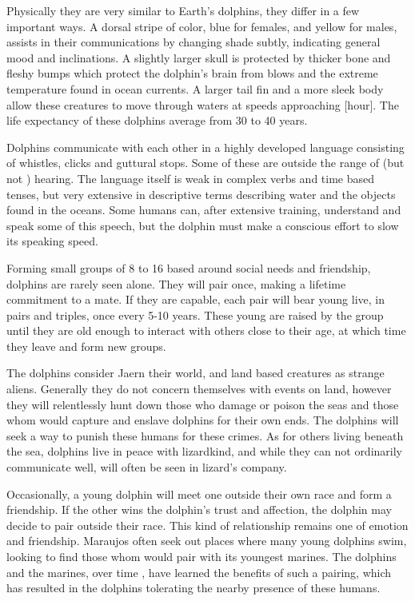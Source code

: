 \begin{multicols*}{2}
Physically they are very similar to Earth's dolphins, they differ in a few important ways. A dorsal stripe of color, blue for females, and yellow for males, assists in their communications by changing shade subtly, indicating general mood and inclinations. A slightly larger skull is protected by thicker bone and fleshy bumps which protect the dolphin's brain from blows and the extreme temperature found in ocean currents. A larger tail fin and a more sleek body allow these creatures to move through waters at speeds approaching [hour]. The life expectancy of these dolphins average from 30 to 40 years.

Dolphins communicate with each other in a highly developed language consisting of whistles, clicks and guttural stops. Some of these are outside the range of  (but not ) hearing. The language itself is weak in complex verbs and time based tenses, but very extensive in descriptive terms describing water and the objects found in the oceans. Some humans can, after extensive training, understand and speak some of this speech, but the dolphin must make a conscious effort to slow its speaking speed.

Forming small groups of 8 to 16 based around social needs and friendship, dolphins are rarely seen alone. They will pair once, making a lifetime commitment to a mate. If they are capable, each pair will bear young live, in pairs and triples, once every 5-10 years. These young are raised by the group until they are old enough to interact with others close to their age, at which time they leave and form new groups.

The dolphins consider Jaern their world, and land based creatures as strange aliens. Generally they do not concern themselves with events on land, however they will relentlessly hunt down those who damage or poison the seas and those whom would capture and enslave dolphins for their own ends. The dolphins will seek a way to punish these humans for these crimes. As for others living beneath the sea, dolphins live in peace with lizardkind, and while they can not ordinarily communicate well, will often be seen in lizard's company.

Occasionally, a young dolphin will meet one outside their own race and form a friendship. If the other wins the dolphin's trust and affection, the dolphin may decide to pair outside their race. This kind of relationship remains one of emotion and friendship. Maraujos often seek out places where many young dolphins swim, looking to find those whom would pair with its youngest marines. The dolphins and the marines, over time , have learned the benefits of such a pairing, which has resulted in the dolphins tolerating the nearby presence of these humans.


\end{multicols*}
